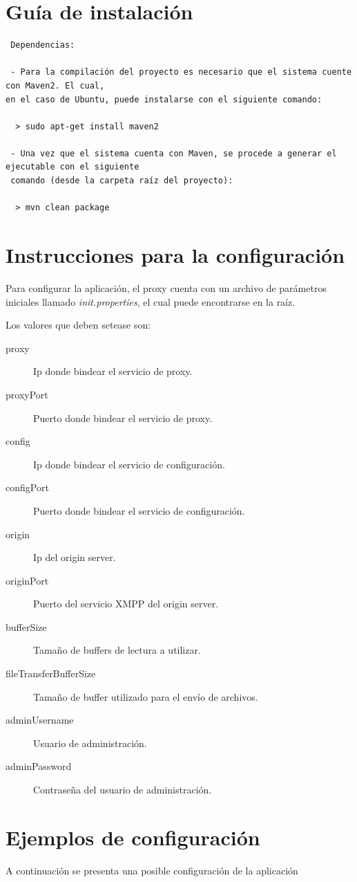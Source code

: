 \documentclass[a4paper,10pt]{article}
\begin{document}
\section{Guía de instalación}

\begin{verbatim}
 Dependencias:

 - Para la compilación del proyecto es necesario que el sistema cuente con Maven2. El cual, 
en el caso de Ubuntu, puede instalarse con el siguiente comando:

  > sudo apt-get install maven2

 - Una vez que el sistema cuenta con Maven, se procede a generar el ejecutable con el siguiente
 comando (desde la carpeta raíz del proyecto):

  > mvn clean package
\end{verbatim}


\section{Instrucciones para la configuración}
Para configurar la aplicación, el proxy cuenta con un archivo de parámetros iniciales llamado \textit{init.properties}, el cual puede
encontrarse en la raíz.

Los valores que deben setease son:
\begin{description}
 \item [proxy] Ip donde bindear el servicio de proxy.
 \item [proxyPort] Puerto donde bindear el servicio de proxy.
 \item [config] Ip donde bindear el servicio de configuración.
 \item [configPort] Puerto donde bindear el servicio de configuración.
 \item [origin] Ip del origin server.
 \item [originPort] Puerto del servicio XMPP del origin server.
 \item [bufferSize] Tamaño de buffers de lectura a utilizar.
 \item [fileTransferBufferSize] Tamaño de buffer utilizado para el envío de archivos.
 \item [adminUsername] Usuario de administración.
 \item [adminPassword] Contraseña del usuario de administración.

\end{description}

\section{Ejemplos de configuración}
A continuación se presenta una posible configuración de la aplicación
\end{document}
